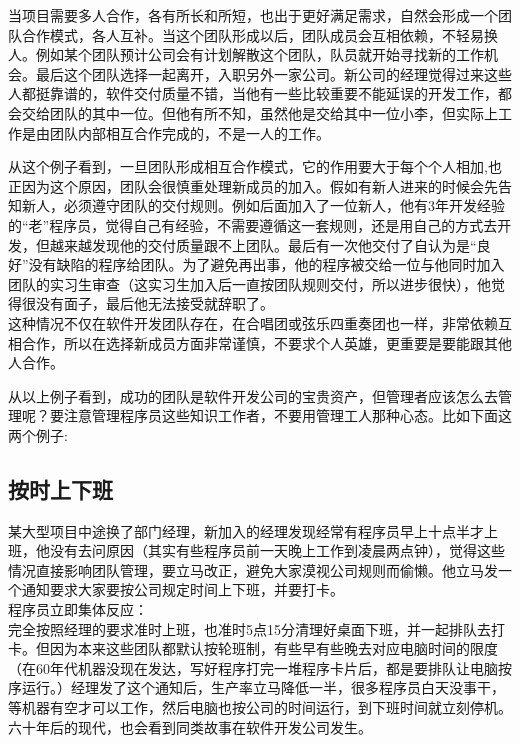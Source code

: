 当项目需要多人合作，各有所长和所短，也出于更好满足需求，自然会形成一个团队合作模式，各人互补。当这个团队形成以后，团队成员会互相依赖，不轻易换人。例如某个团队预计公司会有计划解散这个团队，队员就开始寻找新的工作机会。最后这个团队选择一起离开，入职另外一家公司。新公司的经理觉得过来这些人都挺靠谱的，软件交付质量不错，当他有一些比较重要不能延误的开发工作，都会交给团队的其中一位。但他有所不知，虽然他是交给其中一位小李，但实际上工作是由团队内部相互合作完成的，不是一人的工作。

从这个例子看到，一旦团队形成相互合作模式，它的作用要大于每个个人相加,也正因为这个原因，团队会很慎重处理新成员的加入。假如有新人进来的时候会先告知新人，必须遵守团队的交付规则。例如后面加入了一位新人，他有3年开发经验的``老''程序员，觉得自己有经验，不需要遵循这一套规则，还是用自己的方式去开发，但越来越发现他的交付质量跟不上团队。最后有一次他交付了自认为是``良好''没有缺陷的程序给团队。为了避免再出事，他的程序被交给一位与他同时加入团队的实习生审查（这实习生加入后一直按团队规则交付，所以进步很快），他觉得很没有面子，最后他无法接受就辞职了。\\
这种情况不仅在软件开发团队存在，在合唱团或弦乐四重奏团也一样，非常依赖互相合作，所以在选择新成员方面非常谨慎，不要求个人英雄，更重要是要能跟其他人合作。

从以上例子看到，成功的团队是软件开发公司的宝贵资产，但管理者应该怎么去管理呢？要注意管理程序员这些知识工作者，不要用管理工人那种心态。比如下面这两个例子:\\

\hypertarget{ux6309ux65f6ux4e0aux4e0bux73ed}{%
\subsection{按时上下班}\label{ux6309ux65f6ux4e0aux4e0bux73ed}}

某大型项目中途换了部门经理，新加入的经理发现经常有程序员早上十点半才上班，他没有去问原因（其实有些程序员前一天晚上工作到凌晨两点钟），觉得这些情况直接影响团队管理，要立马改正，避免大家漠视公司规则而偷懒。他立马发一个通知要求大家要按公司规定时间上下班，并要打卡。\\
程序员立即集体反应：\\
完全按照经理的要求准时上班，也准时5点15分清理好桌面下班，并一起排队去打卡。但因为本来这些团队都默认按轮班制，有些早有些晚去对应电脑时间的限度（在60年代机器没现在发达，写好程序打完一堆程序卡片后，都是要排队让电脑按序运行。）经理发了这个通知后，生产率立马降低一半，很多程序员白天没事干，等机器有空才可以工作，然后电脑也按公司的时间运行，到下班时间就立刻停机。\\
六十年后的现代，也会看到同类故事在软件开发公司发生。\\

